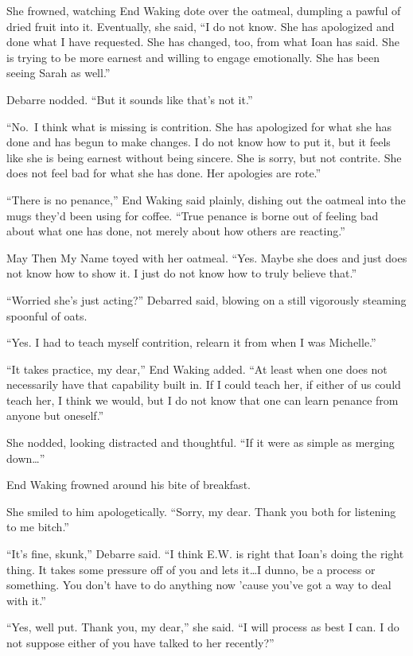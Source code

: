 She frowned, watching End Waking dote over the oatmeal, dumpling a pawful of dried fruit into it. Eventually, she said, ``I do not know. She has apologized and done what I have requested. She has changed, too, from what Ioan has said. She is trying to be more earnest and willing to engage emotionally. She has been seeing Sarah as well.''

Debarre nodded. ``But it sounds like that's not it.''

``No.~I think what is missing is contrition. She has apologized for what she has done and has begun to make changes. I do not know how to put it, but it feels like she is being earnest without being sincere. She is sorry, but not contrite. She does not feel bad for what she has done. Her apologies are rote.''

``There is no penance,'' End Waking said plainly, dishing out the oatmeal into the mugs they'd been using for coffee. ``True penance is borne out of feeling bad about what one has done, not merely about how others are reacting.''

May Then My Name toyed with her oatmeal. ``Yes. Maybe she does and just does not know how to show it. I just do not know how to truly believe that.''

``Worried she's just acting?'' Debarred said, blowing on a still vigorously steaming spoonful of oats.

``Yes. I had to teach myself contrition, relearn it from when I was Michelle.''

``It takes practice, my dear,'' End Waking added. ``At least when one does not necessarily have that capability built in. If I could teach her, if either of us could teach her, I think we would, but I do not know that one can learn penance from anyone but oneself.''

She nodded, looking distracted and thoughtful. ``If it were as simple as merging down\ldots{}''

End Waking frowned around his bite of breakfast.

She smiled to him apologetically. ``Sorry, my dear. Thank you both for listening to me bitch.''

``It's fine, skunk,'' Debarre said. ``I think E.W. is right that Ioan's doing the right thing. It takes some pressure off of you and lets it\ldots I dunno, be a process or something. You don't have to do anything now 'cause you've got a way to deal with it.''

``Yes, well put. Thank you, my dear,'' she said. ``I will process as best I can. I do not suppose either of you have talked to her recently?''

